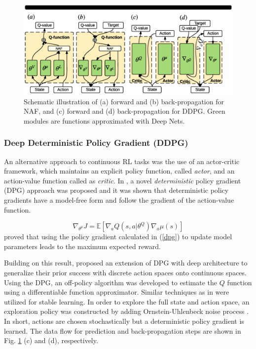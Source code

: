 \documentclass[../thesis.tex]{subfiles}
\begin{document}
\begin{figure}[t]
	\begin{center}
	\centerline{\includegraphics[width=0.8\columnwidth,trim= 80 900 110 70, clip=true]{./MultimodalDRL/fig/naf_ddpg}}
	\caption{Schematic illustration of (a) forward and (b) back-propagation for NAF, and (c) forward and (d) back-propagation for DDPG. Green modules are functions approximated with Deep Nets.}
	\label{fig:CDQN-DDPG}
	\end{center}
\end{figure} 

\subsubsection{Deep Deterministic Policy Gradient (DDPG)}
An alternative approach to continuous RL tasks was the use of an actor-critic framework, which maintains an explicit policy function, called \textit{actor}, and an action-value function called as \textit{critic}. In \citet{dpg}, a novel \emph{deterministic} policy gradient (DPG) approach was proposed and it was shown that deterministic policy gradients have a model-free form and follow the gradient of the action-value function. 

\begin{equation}
\nabla_{\theta^\mu} J = \mathbb{E}[\nabla_a Q(s,a|\theta^Q) \nabla_a \mu(s)]
\label{dpg}
\end{equation}
\citet{dpg} proved that using the policy gradient calculated in (\ref{dpg}) to update model parameters leads to the maximum expected reward.

Building on this result, \citet{DBLP:journals/corr/LillicrapHPHETS15} proposed an extension of DPG with deep architecture to generalize their prior success with discrete action spaces \cite{mnih2015human} onto continuous spaces. Using the DPG, an off-policy algorithm was developed to estimate the $Q$ function using a differentiable function approximator. Similar techniques as in \cite{mnih2015human} were utilized for stable learning. In order to explore the full state and action space, an exploration policy was constructed by adding Ornstein-Uhlenbeck noise process \cite{uhlenbeck1930theory}. In short, actions are chosen stochastically but a deterministic policy gradient is learned. The data flow for prediction and back-propagation steps are shown in Fig. \ref{fig:CDQN-DDPG} (c) and (d), respectively.
\end{document}
